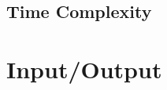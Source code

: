 \documentclass[runningheads, a4paper]{llncs}
\begin{document}
        \subsection{Time Complexity}
        
\section{Input/Output}
        \begin{thebibliography}{4}
            
            
            
        \end{thebibliography}
        
    
\end{document}
